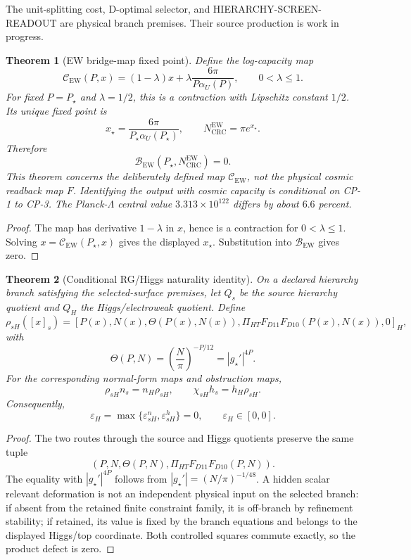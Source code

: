 \documentclass[11pt]{article}
\newtheorem{theorem}{Theorem}[section]
\begin{document}
The unit-splitting cost, D-optimal selector, and
\textsc{HIERARCHY-SCREEN-READOUT} are physical branch premises. Their source
production is work in progress.

\begin{theorem}[EW bridge-map fixed point]\label{thm:ew-exact-capacity}
Define the log-capacity map
\[
\mathcal C_{\mathrm{EW}}(P,x)
=
(1-\lambda)x+\lambda\frac{6\pi}{P\alpha_U(P)},
\qquad 0<\lambda\le1.
\]
For fixed \(P=P_\star\) and \(\lambda=1/2\), this is a contraction with
Lipschitz constant \(1/2\). Its unique fixed point is
\[
x_\star=\frac{6\pi}{P_\star\alpha_U(P_\star)},\qquad
N_{\mathrm{CRC}}^{\mathrm{EW}}=\pi e^{x_\star}.
\]
Therefore
\[
\mathcal B_{\mathrm{EW}}(P_\star,N_{\mathrm{CRC}}^{\mathrm{EW}})=0.
\]
This theorem concerns the deliberately defined map \(\mathcal C_{\mathrm{EW}}\), not the physical
cosmic readback map \(F\). Identifying the output with cosmic capacity is conditional on CP-1 to
CP-3. The Planck-\(\Lambda\) central value \(3.313\times10^{122}\) differs by about \(6.6\)
percent.
\end{theorem}

\begin{proof}
The map has derivative \(1-\lambda\) in \(x\), hence is a contraction for
\(0<\lambda\le1\). Solving \(x=\mathcal C_{\mathrm{EW}}(P_\star,x)\) gives the
displayed \(x_\star\). Substitution into \(\mathcal B_{\mathrm{EW}}\) gives
zero.
\end{proof}

\begin{theorem}[Conditional RG/Higgs naturality identity]\label{thm:rg-higgs-naturality}
On a declared hierarchy branch satisfying the selected-surface premises, let \(Q_s\) be the source hierarchy quotient and
\(Q_H\) the Higgs/electroweak quotient. Define
\[
\rho_{sH}([x]_s)=
\left[
P(x),N(x),
\Theta(P(x),N(x)),
\Pi_{HT}F_{D11}F_{D10}(P(x),N(x)),0
\right]_H,
\]
with
\[
\Theta(P,N)=
\left(\frac{N}{\pi}\right)^{-P/12}
=|g_\star'|^{4P}.
\]
For the corresponding normal-form maps and obstruction maps,
\[
\rho_{sH}n_s=n_H\rho_{sH},
\qquad
\chi_{sH}h_s=h_H\rho_{sH}.
\]
Consequently,
\[
\varepsilon_H
=
\max\{\varepsilon^n_{sH},\varepsilon^h_{sH}\}
=0,
\qquad
\varepsilon_H\in[0,0].
\]
\end{theorem}

\begin{proof}
The two routes through the source and Higgs quotients preserve the same tuple
\[
(P,N,\Theta(P,N),\Pi_{HT}F_{D11}F_{D10}(P,N)).
\]
The equality with \(|g_\star'|^{4P}\) follows from
\(|g_\star'|=(N/\pi)^{-1/48}\). A hidden scalar relevant deformation is not an independent
physical input on the selected branch: if absent from the retained finite constraint family, it
is off-branch by refinement stability; if retained, its value is fixed by the branch equations
and belongs to the displayed Higgs/top coordinate. Both controlled squares commute exactly, so
the product defect is zero.
\end{proof}
\end{document}
